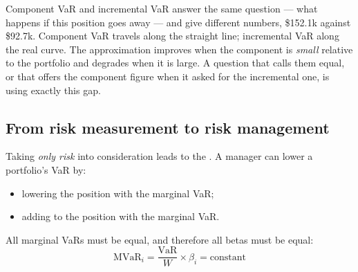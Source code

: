 \begin{imtrapbox}[breakable=false,title={Down the tangent, or down the curve}]
Component VaR and incremental VaR answer the same question --- what happens if
this position goes away --- and give different numbers, \$152.1k against \$92.7k.
Component VaR travels along the straight line; incremental VaR along the real
curve. The approximation improves when the component is \emph{small} relative to
the portfolio and degrades when it is large. A question that calls them equal, or
that offers the component figure when it asked for the incremental one, is using
exactly this gap.
\end{imtrapbox}


\subsection{From risk measurement to risk management}

Taking \emph{only risk} into consideration leads to the .
A manager can lower a portfolio's VaR by:

\begin{itemize}
\item lowering the position with the  marginal VaR;
\item adding to the position with the  marginal VaR.
\end{itemize}

\begin{imkeybox}[title={At the global minimum}]
All marginal VaRs must be equal, and therefore all betas must be equal:
\[ \text{MVaR}_i = \frac{\text{VaR}}{W} \times \beta_i = \text{constant} \]
\end{imkeybox}

\gapbadge
{}

